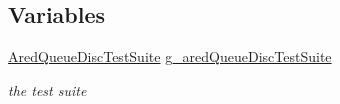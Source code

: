 \subsection*{Variables}
\begin{DoxyCompactItemize}
\item 
\hyperlink{classAredQueueDiscTestSuite}{Ared\+Queue\+Disc\+Test\+Suite} \hyperlink{group__traffic-control-test_gaff3ce56f453bf048d86ed920d4ef289b}{g\+\_\+ared\+Queue\+Disc\+Test\+Suite}
\begin{DoxyCompactList}\small\item\em the test suite \end{DoxyCompactList}\end{DoxyCompactItemize}

